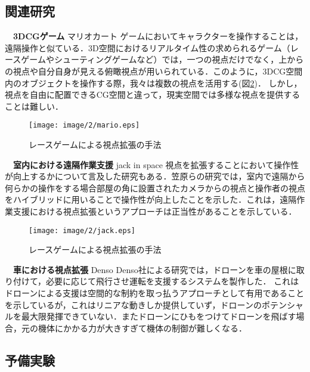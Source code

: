 \subsection{関連研究}
{\bf　3DCGゲーム} マリオカート
ゲームにおいてキャラクターを操作することは，遠隔操作と似ている．3D空間におけるリアルタイム性の求められるゲーム（レースゲームやシューティングゲームなど）では，一つの視点だけでなく，上からの視点や自分自身が見える俯瞰視点が用いられている．このように，3DCG空間内のオブジェクトを操作する際，我々は複数の視点を活用する(図\ref{mario})\cite{mario}．
しかし，視点を自由に配置できるCG空間と違って，現実空間では多様な視点を提供することは難しい．
\begin{figure}[htbp]
 \begin{center}
  \texttt{[image: image/2/mario.eps]}
 \end{center}
 \caption{レースゲームによる視点拡張の手法}
 \label{mario}
\end{figure} 
{\bf　室内における遠隔作業支援} jack in space
視点を拡張することにおいて操作性が向上するかについて言及した研究もある．笠原らの研究では，室内で遠隔から何らかの操作をする場合部屋の角に設置されたカメラからの視点と操作者の視点をハイブリッドに用いることで操作性が向上したことを示した．これは，遠隔作業支援における視点拡張というアプローチは正当性があることを示している．
\begin{figure}[htbp]
 \begin{center}
  \texttt{[image: image/2/jack.eps]}
 \end{center}
 \caption{レースゲームによる視点拡張の手法}
 \label{mario}
\end{figure} 
{\bf　車における視点拡張} Denso
Denso社による研究では，ドローンを車の屋根に取り付けて，必要に応じて飛行させ運転を支援するシステムを製作した．
これはドローンによる支援は空間的な制約を取っ払うアプローチとして有用であることを示しているが，これはリニアな動きしか提供していず，ドローンのポテンシャルを最大限発揮できていない．またドローンにひもをつけてドローンを飛ばす場合，元の機体にかかる力が大きすぎて機体の制御が難しくなる．

\subsection{予備実験}　

